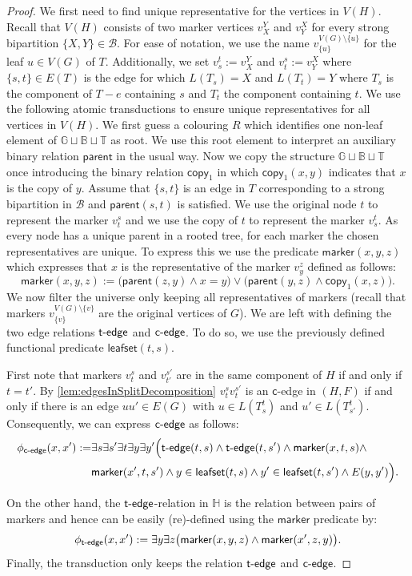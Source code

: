 \documentclass{lmcs} %
\newcommand{\copyV}[1][]{\ensuremath{\mathsf{copy}_{#1}}\xspace}
\newcommand{\parent}{\ensuremath{\mathsf{parent}}\xspace}
\newcommand{\tedge}{\ensuremath{\mathsf{t}\text-\mathsf{edge}}\xspace}
\newcommand{\cedge}{\ensuremath{\mathsf{c}\text-\mathsf{edge}}\xspace}
\newcommand{\splitSet}{\ensuremath{\mathcal{B}}}
\newcommand{\marker}{\ensuremath{\mathsf{marker}}\xspace}
\newcommand{\leafset}{\ensuremath{\mathsf{leafset}}\xspace}
\newcommand{\ifof}{if and only if\xspace}
\begin{document}
\begin{proof}
    We first need to find unique representative for the vertices in $V(H)$. Recall that $V(H)$ consists of two marker vertices $v_X^Y$ and $v_Y^X$ for every strong bipartition $\{X,Y\}\in \splitSet$.
    For ease of notation, we use the name $v^{V(G)\setminus\{u\}}_{\{u\}}$ for the leaf $u\in V(G)$ of $T$. Additionally, we
    set $v_s^t:=v_X^Y$ and $v_t^s:=v_Y^X$ where $\{s,t\}\in E(T)$ is the edge for which $L(T_s)=X$ and $L(T_t)=Y$ where $T_s$ is the component of $T-e$ containing $s$ and $T_t$ the component containing $t$. We use the following atomic transductions to ensure unique representatives for all vertices in $V(H)$. We first guess a colouring $R$ which identifies one non-leaf element of $\mathbb{G}\sqcup \mathbb{B}\sqcup \mathbb{T}$ as root. We use this root element to interpret an auxiliary binary relation $\parent$ in the usual way. Now we copy the structure $\mathbb{G}\sqcup \mathbb{B}\sqcup \mathbb{T}$ once introducing the binary relation $\copyV[1]$ in which $\copyV[1](x,y)$ indicates that $x$ is the copy of $y$. Assume that $\{s,t\}$ is an edge in $T$ corresponding to a strong bipartition in $\splitSet$ and $\parent(s,t)$ is satisfied. We use the original node $t$ to represent the marker $v_t^s$ and we use the copy of $t$ to represent the marker $v_s^t$. As every node has a unique parent in a rooted tree, for each marker the chosen representatives are unique. To express this we use the predicate $\marker(x,y,z)$ which expresses that $x$ is the representative of the marker $v_y^z$ defined as follows:
    $$\marker(x,y,z):= \Big(\parent(z,y)\land x=y\Big)\lor \Big(\parent(y,z)\land \copyV[1](x,z)\Big).$$
    We now filter the universe only keeping all representatives of markers (recall that markers $v_{\{v\}}^{V(G)\setminus\{v\}}$ are the original vertices of $G$). We are left with defining the two edge relations $\tedge$ and $\cedge$. To do so, we use the previously defined functional predicate $\leafset(t,s)$.

    First note that markers $v_t^s$ and $v_{t'}^{s'}$ are in the same component of $H$ \ifof $t=t'$. By \autoref{lem:edgesInSplitDecomposition} $v_t^sv_t^{s'}$ is an $\textsf{c}$-edge in $(H,F)$ \ifof there is an edge $uu'\in E(G)$ with $u\in L(T^t_s)$ and $u'\in L(T^t_{s'})$.
    Consequently, we can express $\cedge$ as follows:
    \begin{align*}
        \phi_{\cedge}(x,x'):=&\exists s \exists s' \exists t \exists y \exists y' \Big( \tedge(t,s)\land \tedge(t,s')\land \marker(x,t,s)\land
        \\*
        &\marker(x',t,s')\land
        y\in \leafset(t,s)\land y'\in \leafset(t,s') \land E(y,y') \Big).
    \end{align*}

    On the other hand, the
    $\tedge$-relation in $\mathbb{H}$ is the relation between pairs of markers and hence can be easily (re)-defined using the $\marker$ predicate by:
    $$\phi_{\tedge}(x,x'):=\exists y \exists z \big(\marker(x,y,z)\land \marker(x',z,y)\big).$$
    Finally, the transduction only keeps the relation $\tedge$ and $\cedge$.
\end{proof}
\end{document}
